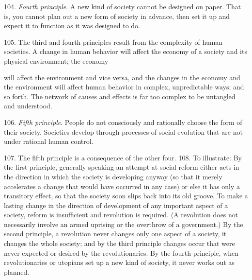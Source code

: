 \documentclass{article}
\begin{document}
104. \textit{Fourth principle}. A new kind of society cannot be designed on paper. That is, you cannot 
plan out a new form of society in advance, then set it up and expect it to function as it was designed 
to do. \vspace{\baselineskip}

105. The third and fourth principles result from the complexity of human societies. A change in 
human behavior will affect the economy of a society and its physical environment; the economy 
 
will affect the environment and vice versa, and the changes in the economy and the environment 
will affect human behavior in complex, unpredictable ways; and so forth. The network of causes 
and effects is far too complex to be untangled and understood. \vspace{\baselineskip}

106. \textit{Fifth principle}. People do not consciously and rationally choose the form of their 
society. Societies develop through processes of social evolution that are not under rational human 
control. \vspace{\baselineskip} 

107. The fifth principle is a consequence of the other four. 108. To illustrate: By the first principle, generally speaking an attempt at social reform either acts 
in the direction in which the society is developing anyway (so that it merely accelerates a change 
that would have occurred in any case) or else it has only a transitory effect, so that the society soon 
slips back into its old groove. To make a lasting change in the direction of development of any 
important aspect of a society, reform is insufficient and revolution is required. (A revolution does 
not necessarily involve an armed uprising or the overthrow of a government.) By the second 
principle, a revolution never changes only one aspect of a society, it changes the whole society; 
and by the third principle changes occur that were never expected or desired by the 
revolutionaries. By the fourth principle, when revolutionaries or utopians set up a new kind of 
society, it never works out as planned. \vspace{\baselineskip}
\end{document}
